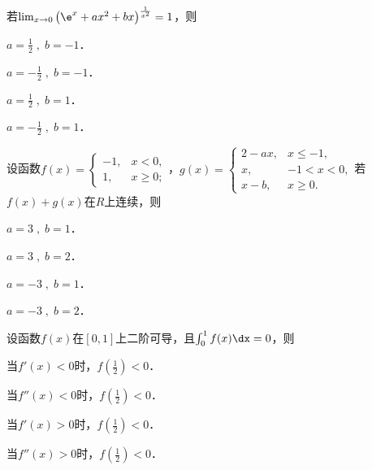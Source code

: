 \documentclass[plain,noanswer,medmath]{../../template/jnuexam}
\begin{document}






\begin{problem}
若$\lim_{x \to 0} \left(\e^x + ax^2 + bx \right)^{\frac{1}{x^2}} = 1$，则\pickout{}
\begin{abcd}
\item $a = \frac{1}{2}\;,\;b = - 1$．
\item $a = - \frac{1}{2}\;,\;b = - 1$．
\item $a = \frac{1}{2}\;,\;b = 1$．
\item $a = - \frac{1}{2}\;,\;b = 1$．
\end{abcd}
\end{problem}




\begin{problem}
设函数$f(x) = \begin{cases}
  -1, & x < 0, \\
   1, & x \ge 0;
\end{cases}$，$g(x) = \begin{cases}
  2 - ax, & x \le - 1, \\
       x, & -1 < x < 0, \\
   x - b, & x \ge 0.
\end{cases}$若$f(x) + g(x)$在$R$上连续，则\pickout{}
\begin{abcd}
\item $a = 3\;,\;b = 1$．
\item $a = 3\;,\;b = 2$．
\item $a = - 3\;,\;b = 1$．
\item $a = - 3\;,\;b = 2$．
\end{abcd}
\end{problem}


\begin{problem}
设函数$f(x)$在$[0,1]$上二阶可导，且$\int_0^1 f(x)\dx = 0$，则\pickout{}
\begin{abcd}
\item 当$f'(x) < 0$时，$f\left(\frac{1}{2} \right) < 0$．
\item 当$f''(x) < 0$时，$f\left(\frac{1}{2} \right) < 0$．
\item 当$f'(x) > 0$时，$f\left(\frac{1}{2} \right) < 0$．
\item 当$f''(x) > 0$时，$f\left(\frac{1}{2} \right) < 0$．
\end{abcd}
\end{problem}
\end{document}
